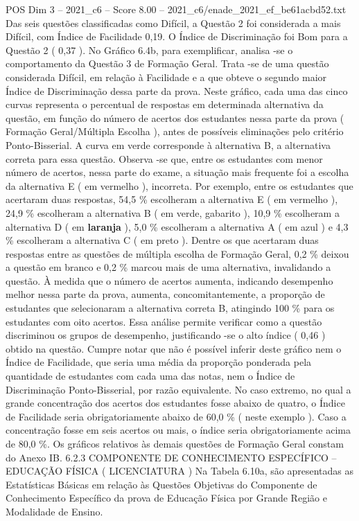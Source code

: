 \begin{textsample}{POS Dim 3 – 2021\_c6 – Score 8.00 – 2021\_c6/enade\_2021\_ef\_be61acbd52.txt}
Das seis questões classificadas como Difícil, a Questão 2 foi considerada a mais Difícil, com Índice de Facilidade 0,19.
O Índice de Discriminação foi Bom para a Questão 2 ( 0,37 ).
No Gráfico 6.4b, para exemplificar, analisa -se o comportamento da Questão 3 de Formação Geral.
Trata -se de uma questão considerada Difícil, em relação à Facilidade e a que obteve o segundo maior Índice de Discriminação dessa parte da prova.
Neste gráfico, cada uma das cinco curvas representa o percentual de respostas em determinada alternativa da questão, em função do número de acertos dos estudantes nessa parte da prova ( Formação Geral/Múltipla Escolha ), antes de possíveis eliminações pelo critério Ponto-Bisserial.
A curva em verde corresponde à alternativa B, a alternativa correta para essa questão.
Observa -se que, entre os estudantes com menor número de acertos, nessa parte do exame, a situação mais frequente foi a escolha da alternativa E ( em vermelho ), incorreta.
Por exemplo, entre os estudantes que acertaram duas respostas, 54,5 \% escolheram a alternativa E ( em vermelho ), 24,9 \% escolheram a alternativa B ( em verde, gabarito ), 10,9 \% escolheram a alternativa D ( em \textbf{laranja} ), 5,0 \% escolheram a alternativa A ( em azul ) e 4,3 \% escolheram a alternativa C ( em preto ).
Dentre os que acertaram duas respostas entre as questões de múltipla escolha de Formação Geral, 0,2 \% deixou a questão em branco e 0,2 \% marcou mais de uma alternativa, invalidando a questão.
À medida que o número de acertos aumenta, indicando desempenho melhor nessa parte da prova, aumenta, concomitantemente, a proporção de estudantes que selecionaram a alternativa correta B, atingindo 100 \% para os estudantes com oito acertos.
Essa análise permite verificar como a questão discriminou os grupos de desempenho, justificando -se o alto índice ( 0,46 ) obtido na questão.
Cumpre notar que não é possível inferir deste gráfico nem o Índice de Facilidade, que seria uma média da proporção ponderada pela quantidade de estudantes com cada uma das notas, nem o Índice de Discriminação Ponto-Bisserial, por razão equivalente.
No caso extremo, no qual a grande concentração dos acertos dos estudantes fosse abaixo de quatro, o Índice de Facilidade seria obrigatoriamente abaixo de 60,0 \% ( neste exemplo ).
Caso a concentração fosse em seis acertos ou mais, o índice seria obrigatoriamente acima de 80,0 \%.
Os gráficos relativos às demais questões de Formação Geral constam do Anexo IB. 6.2.3 COMPONENTE DE CONHECIMENTO ESPECÍFICO – EDUCAÇÃO FÍSICA ( LICENCIATURA ) Na Tabela 6.10a, são apresentadas as Estatísticas Básicas em relação às Questões Objetivas do Componente de Conhecimento Específico da prova de Educação Física por Grande Região e Modalidade de Ensino.

\end{textsample}
